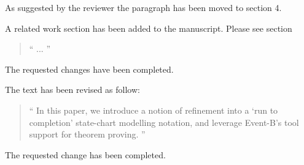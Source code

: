 \documentclass{response}
\begin{document}
\begin{response}
  As suggested by the reviewer the paragraph has been moved to section 4. 
\end{response}


\begin{comment}{Reviewer \#2}
 - The paper lacks a related work section. Please add one.
\end{comment}

\begin{response}
A related work section has been added to the manuscript. Please see section 
  \begin{quote}

    `` ...
   ''
  \end{quote}
\end{response}



\begin{comment}{Reviewer \#2}
Minor points:
  - After an introductory word or phrase, use a comma (this is a recurrent in
  the paper). For example, e.g. --> e.g., i.e. --> i.e., "To verify liveness 
  we outline" --> "To verify liveness,  we outline", etc.
\end{comment}

\begin{response}
  The requested changes have been completed.
\end{response}


\begin{comment}{Reviewer \#2}
- Abstract: "We introduce" --> "In this paper, we introduce".
\end{comment}

\begin{response}
  The text has been revised as follow:
  \begin{quote}
    `` In this paper, we introduce a notion of refinement into a ‘run to completion’ state-chart 
    modelling notation, and leverage Event-B’s tool support for theorem proving. ''
  \end{quote}
\end{response}


\begin{comment}{Reviewer \#2}
- Add "Even-B" to the list of keywords.
\end{comment}

\begin{response}
  The requested change has been completed.
\end{response}
\end{document}
